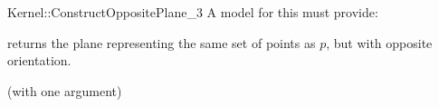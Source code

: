 \begin{ccRefFunctionObjectConcept}{Kernel::ConstructOppositePlane_3}
A model for this must provide:


{returns the plane representing the same set of points as $p$,
but with opposite orientation.}

\ccRefines
{} (with one argument)

\ccSeeAlso
{} \\

\end{ccRefFunctionObjectConcept}
